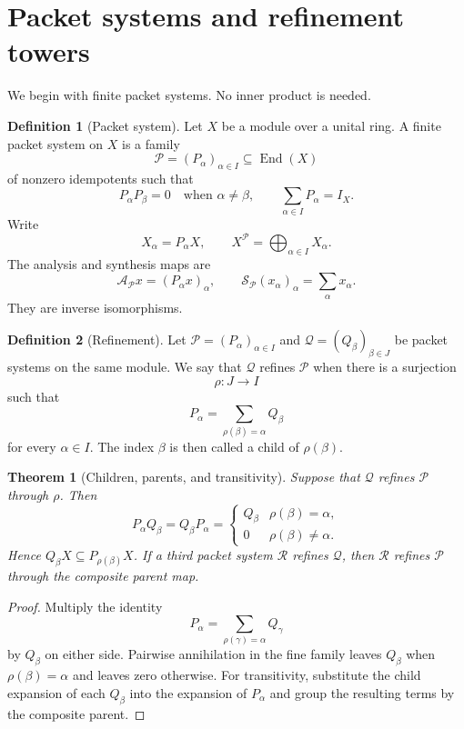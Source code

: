 \documentclass{aomart}
\newtheorem{theorem}{Theorem}[section]
\theoremstyle{definition}
\newtheorem{definition}[definition]{Definition}
\theoremstyle{remark}
\newcommand{\Acal}{\mathcal A}
\newcommand{\Pcal}{\mathcal P}
\newcommand{\Qcal}{\mathcal Q}
\newcommand{\Scal}{\mathcal S}
\newcommand{\Rcal}{\mathcal R}
\newcommand{\End}{\operatorname{End}}
\begin{document}
\section{Packet systems and refinement towers}\label{sec:refinement}

We begin with finite packet systems.  No inner product is needed.

\begin{definition}[Packet system]\label{def:packet_system}
Let $X$ be a module over a unital ring.  A finite packet system on $X$ is a family
\[
\Pcal=(P_\alpha)_{\alpha\in I}
\subseteq\End(X)
\]
of nonzero idempotents such that
\[
P_\alpha P_\beta=0
\quad\text{when }\alpha\ne\beta,
\qquad
\sum_{\alpha\in I}P_\alpha=I_X.
\]
Write
\[
X_\alpha=P_\alpha X,
\qquad
X^{\Pcal}=\bigoplus_{\alpha\in I}X_\alpha.
\]
The analysis and synthesis maps are
\[
\Acal_{\Pcal}x=(P_\alpha x)_\alpha,
\qquad
\Scal_{\Pcal}(x_\alpha)_\alpha=\sum_\alpha x_\alpha.
\]
They are inverse isomorphisms.
\end{definition}

\begin{definition}[Refinement]\label{def:refinement}
Let $\Pcal=(P_\alpha)_{\alpha\in I}$ and $\Qcal=(Q_\beta)_{\beta\in J}$ be packet systems on the same module.  We say that $\Qcal$ refines $\Pcal$ when there is a surjection
\[
\rho:J\longrightarrow I
\]
such that
\[
P_\alpha=\sum_{\rho(\beta)=\alpha}Q_\beta
\]
for every $\alpha\in I$.  The index $\beta$ is then called a child of $\rho(\beta)$.
\end{definition}

\begin{theorem}[Children, parents, and transitivity]\label{thm:children_transitivity}
Suppose that $\Qcal$ refines $\Pcal$ through $\rho$.  Then
\[
P_\alpha Q_\beta
=
Q_\beta P_\alpha
=
\begin{cases}
Q_\beta & \rho(\beta)=\alpha,\\
0 & \rho(\beta)\ne\alpha.
\end{cases}
\]
Hence $Q_\beta X\subseteq P_{\rho(\beta)}X$.  If a third packet system $\Rcal$ refines $\Qcal$, then $\Rcal$ refines $\Pcal$ through the composite parent map.
\end{theorem}

\begin{proof}
Multiply the identity
\[
P_\alpha=\sum_{\rho(\gamma)=\alpha}Q_\gamma
\]
by $Q_\beta$ on either side.  Pairwise annihilation in the fine family leaves $Q_\beta$ when $\rho(\beta)=\alpha$ and leaves zero otherwise.  For transitivity, substitute the child expansion of each $Q_\beta$ into the expansion of $P_\alpha$ and group the resulting terms by the composite parent.
\end{proof}
\end{document}
